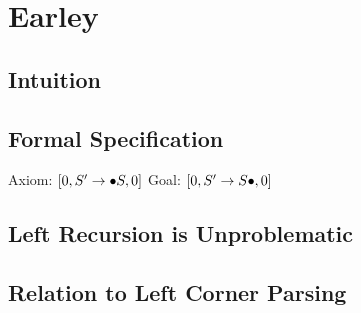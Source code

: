 \section{Earley}

\subsection{Intuition}

\subsection{Formal Specification}
Axiom: $[0, S' \rewrite \psep S,0]$
Goal: $[0, S' \rewrite S \psep,0]$

\begin{prooftree}
\end{prooftree}

\begin{prooftree}
\end{prooftree}

\begin{prooftree}
\end{prooftree}

\subsection{Left Recursion is Unproblematic}

\subsection{Relation to Left Corner Parsing}
